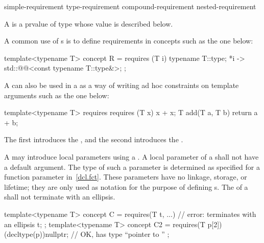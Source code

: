 \begin{bnf}
\br
    simple-requirement\br
    type-requirement\br
    compound-requirement\br
    nested-requirement
\end{bnf}

\pnum
A  is a prvalue of type 
whose value is described below.

\pnum
\begin{example}
A common use of s is to define
requirements in concepts such as the one below:
\begin{codeblock}
template<typename T>
  concept R = requires (T i) {
    typename T::type;
    {*i} -> std::@@<const typename T::type&>;
  };
\end{codeblock}
A  can also be used in a
 as a way of writing ad hoc
constraints on template arguments such as the one below:
\begin{codeblock}
template<typename T>
  requires requires (T x) { x + x; }
    T add(T a, T b) { return a + b; }
\end{codeblock}
The first  introduces the
, and the second
introduces the .
\end{example}

\pnum
A  may introduce local parameters using a
.
A local parameter of a  shall not have a
default argument.
The type of such a parameter is determined as specified for
a function parameter in~\ref{dcl.fct}.
These parameters have no linkage, storage, or lifetime; they are only used
as notation for the purpose of defining s.
The  of a
shall not terminate with an ellipsis.
\begin{example}
\begin{codeblock}
template<typename T>
concept C = requires(T t, ...) {    // error: terminates with an ellipsis
  t;
};
template<typename T>
concept C2 = requires(T p[2]) {
  (decltype(p))nullptr;             // OK,  has type ``pointer to ''
};
\end{codeblock}
\end{example}

